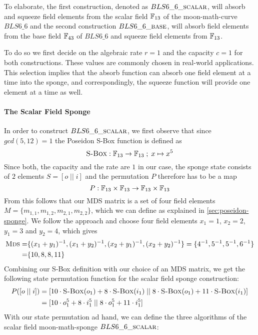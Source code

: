 To elaborate, the first construction, denoted as $BLS6\_6\_\textsc{scalar}$, will absorb and squeeze field elements from the scalar field $\mathbb{F}_{13}$ of the moon-math-curve $BLS6\_6$ and the second construction $BLS6\_6\_\textsc{base}$, will absorb field elements from the base field $\mathbb{F}_{43}$ of $BLS6\_6$ and squeeze field elements from $\mathbb{F}_{13}$. 

To do so we first decide on the algebraic rate $r=1$ and the capacity $c=1$ for both constructions. These values are commonly chosen in real-world applications. This selection implies that the absorb function can absorb one field element at a time into the sponge, and correspondingly, the squeeze function will provide one element at a time as well.
\paragraph{The Scalar Field Sponge} In order to construct $BLS6\_6\_\textsc{scalar}$, we first observe that since $gcd(5,12)=1$ the Poseidon S-Box function is defined as 
$$
\textsc{S-Box}: \mathbb{F}_{13} \to \mathbb{F}_{13}\;;\; x \mapsto x^5
$$
Since both, the capacity and the rate are $1$ in our case,  the sponge state consists of $2$ elements $S=[o\;||\;i]$ and the permutation $P$ therefore has to be a map 
$$ 
P : \mathbb{F}_{13}\times \mathbb{F}_{13} \to \mathbb{F}_{13}\times \mathbb{F}_{13}
$$
From this follows that our MDS matrix is a set of four field elements $M = \{m_{1,1}, m_{1,2}, m_{2,1},  m_{2,2}\}$, which we can define as explained in \ref{sec:poseidon-sponge}. We follow the approach and choose four field elements
$x_1=1$, $x_2=2$, $y_1=3$ and $y_2=4$, which gives
\begin{align*}
\textsc{Mds} = & \{(x_1+y_1)^{-1},(x_1+y_2)^{-1}, (x_2+y_1)^{-1},(x_2+y_2)^{-1}\}
    =  \{4^{-1},5^{-1}, 5^{-1},6^{-1}\}\\
    = & \{10,8,8,11\}
\end{align*}
Combining our S-Box definition with our choice of an MDS matrix, we get the following state permutation function for the scalar field sponge construction:
\begin{align}
P([o\;||\;i]) &= [10\cdot \textsc{S-Box}(o_1) + 8\cdot \textsc{S-Box}(i_1) \;||\; 8\cdot \textsc{S-Box}(o_1) + 11\cdot \textsc{S-Box}(i_1)]\\
  &= [10\cdot o_1^5 + 8\cdot i_1^5 \;||\; 8\cdot o_1^5 + 11\cdot i_1^5]
\end{align}
With our state permutation ad hand, we can define the three algorithms of the scalar field moon-math-sponge $BLS6\_6\_\textsc{scalar}$:
